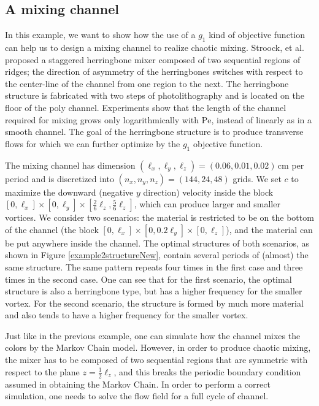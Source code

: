 \subsection{A mixing channel }
In this example, we want to show how the use of a $g_1$ kind of
objective function can help us to design a mixing channel to realize
chaotic mixing. Stroock, et al.\ \cite{Stroock2002} proposed a
staggered herringbone mixer composed of two sequential
regions of ridges; the direction of asymmetry of the herringbones
switches with respect to the center-line of the channel from one region
to the next. The herringbone structure is fabricated with two steps of
photolithography and is located on the floor of the poly channel.
Experiments show that the length of the channel required for mixing
grows only logarithmically with $\text{Pe}$, instead of linearly as
in a smooth channel. The goal of the herringbone structure is to
produce transverse flows for which we can further optimize by the
$g_1$ objective function.

The mixing channel has dimension $(\ell_x,\ell_y,\ell_z) =
(0.06,0.01,0.02)\,$cm per period and is discretized into
$(n_x,n_y,n_z)=(144,24,48)$ grids. We set $c$ to maximize the downward
(negative $y$ direction) velocity inside the block
$[0,\ell_x]\times[0,\ell_y]\times[\frac{2}{6}\ell_z,\frac{5}{6}\ell_z ]$, which
can produce larger and smaller vortices. We consider two
scenarios: the material is restricted to be on the bottom of the
channel (the block $[0,\ell_x]\times[0,0.2\ell_y]\times[0,\ell_z]$), and the
material can be put anywhere inside the channel. The optimal
structures of both scenarios, as shown in Figure
\ref{example2structureNew}, contain several periods of (almost) the
same structure. The same pattern repeats four times in the first case
and three times in the second case. One can see that for the first
scenario, the optimal structure is also a herringbone type, but has a
higher frequency for the smaller vortex. For the second scenario, the
structure is formed by much more material and also tends to have a
higher frequency for the smaller vortex.


Just like in the previous example, one can simulate how the channel
mixes the colors by the Markov Chain model. However, in order to
produce chaotic mixing, the mixer has to be composed of two sequential
regions that are symmetric with respect to the plane
$z=\frac{1}{2}\ell_z$, and this breaks the periodic boundary condition
assumed in obtaining the Markov Chain. In order to perform a correct
simulation, one needs to solve the flow field for a full cycle of
channel.

